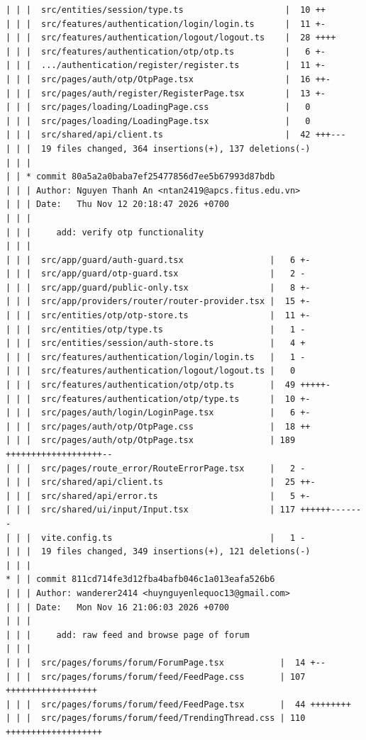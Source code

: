 \documentclass[12pt]{article}
\begin{document}
\begin{lstlisting}[numbers=none,breaklines=true]
| | |  src/entities/session/type.ts                    |  10 ++
| | |  src/features/authentication/login/login.ts      |  11 +-
| | |  src/features/authentication/logout/logout.ts    |  28 ++++
| | |  src/features/authentication/otp/otp.ts          |   6 +-
| | |  .../authentication/register/register.ts         |  11 +-
| | |  src/pages/auth/otp/OtpPage.tsx                  |  16 ++-
| | |  src/pages/auth/register/RegisterPage.tsx        |  13 +-
| | |  src/pages/loading/LoadingPage.css               |   0
| | |  src/pages/loading/LoadingPage.tsx               |   0
| | |  src/shared/api/client.ts                        |  42 +++---
| | |  19 files changed, 364 insertions(+), 137 deletions(-)
| | |
| | * commit 80a5a2a0baba7ef25477856d7ee5b67993d87bdb
| | | Author: Nguyen Thanh An <ntan2419@apcs.fitus.edu.vn>
| | | Date:   Thu Nov 12 20:18:47 2026 +0700
| | |
| | |     add: verify otp functionality
| | |
| | |  src/app/guard/auth-guard.tsx                 |   6 +-
| | |  src/app/guard/otp-guard.tsx                  |   2 -
| | |  src/app/guard/public-only.tsx                |   8 +-
| | |  src/app/providers/router/router-provider.tsx |  15 +-
| | |  src/entities/otp/otp-store.ts                |  11 +-
| | |  src/entities/otp/type.ts                     |   1 -
| | |  src/entities/session/auth-store.ts           |   4 +
| | |  src/features/authentication/login/login.ts   |   1 -
| | |  src/features/authentication/logout/logout.ts |   0
| | |  src/features/authentication/otp/otp.ts       |  49 +++++-
| | |  src/features/authentication/otp/type.ts      |  10 +-
| | |  src/pages/auth/login/LoginPage.tsx           |   6 +-
| | |  src/pages/auth/otp/OtpPage.css               |  18 ++
| | |  src/pages/auth/otp/OtpPage.tsx               | 189 +++++++++++++++++++--
| | |  src/pages/route_error/RouteErrorPage.tsx     |   2 -
| | |  src/shared/api/client.ts                     |  25 ++-
| | |  src/shared/api/error.ts                      |   5 +-
| | |  src/shared/ui/input/Input.tsx                | 117 ++++++-------
| | |  vite.config.ts                               |   1 -
| | |  19 files changed, 349 insertions(+), 121 deletions(-)
| | |
* | | commit 811cd714fe3d12fba4bafb046c1a013eafa526b6
| | | Author: wanderer2414 <huynguyenlequoc13@gmail.com>
| | | Date:   Mon Nov 16 21:06:03 2026 +0700
| | |
| | |     add: raw feed and browse page of forum
| | |
| | |  src/pages/forums/forum/ForumPage.tsx           |  14 +--
| | |  src/pages/forums/forum/feed/FeedPage.css       | 107 ++++++++++++++++++
| | |  src/pages/forums/forum/feed/FeedPage.tsx       |  44 ++++++++
| | |  src/pages/forums/forum/feed/TrendingThread.css | 110 +++++++++++++++++++

\end{lstlisting}
\end{document}
